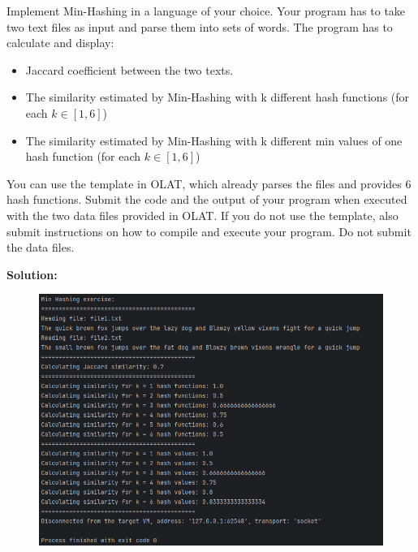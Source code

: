 Implement Min-Hashing in a language of your choice.
Your program has to take two text files as input and parse them into sets of words.
The program has to calculate and display:
\begin{itemize}
\item Jaccard coefficient between the two texts.
\item The similarity estimated by Min-Hashing with k different hash functions (for each $k \in [1,6]$)
\item The similarity estimated by Min-Hashing with k different min values of one hash function (for each $k \in [1,6]$)
\end{itemize}

You can use the template in OLAT, which already parses the files and provides 6 hash functions.
Submit the code and the output of your program when executed with the two data files provided in OLAT.
If you do not use the template, also submit instructions on how to compile and execute your program.
Do not submit the data files.

{\bf Solution:}
\begin{figure}[H]
  \centering
  \includegraphics[scale = 0.4]{MinHashOutput.PNG}
\end{figure}


